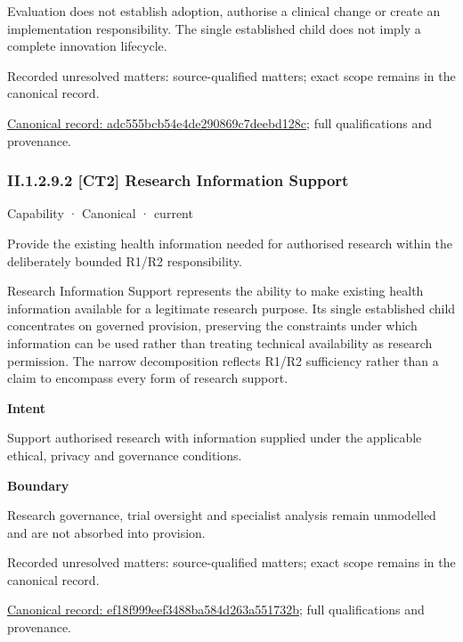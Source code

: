 Evaluation does not establish adoption, authorise a clinical change or create an implementation responsibility. The single established child does not imply a complete innovation lifecycle.


{\small Recorded unresolved matters: source-qualified matters; exact scope remains in the canonical record.}\par
{\footnotesize \href{../../../../continuum/strategy/capability/adc555bcb54e4de290869c7deebd128c.md}{Canonical record: adc555bcb54e4de290869c7deebd128c}; full qualifications and provenance.}\par
\subsubsection*{II.1.2.9.2 [CT2] Research Information Support}
\label{navigation:II.1.2.9.2}

\label{element:ef18f999eef3488ba584d263a551732b}
{\small Capability · Canonical · current}\par

Provide the existing health information needed for authorised research within the deliberately bounded R1/R2 responsibility.



Research Information Support represents the ability to make existing health information available for a legitimate research purpose. Its single established child concentrates on governed provision, preserving the constraints under which information can be used rather than treating technical availability as research permission. The narrow decomposition reflects R1/R2 sufficiency rather than a claim to encompass every form of research support.



\textbf{Intent}



Support authorised research with information supplied under the applicable ethical, privacy and governance conditions.



\textbf{Boundary}



Research governance, trial oversight and specialist analysis remain unmodelled and are not absorbed into provision.


{\small Recorded unresolved matters: source-qualified matters; exact scope remains in the canonical record.}\par
{\footnotesize \href{../../../../continuum/strategy/capability/ef18f999eef3488ba584d263a551732b.md}{Canonical record: ef18f999eef3488ba584d263a551732b}; full qualifications and provenance.}\par

